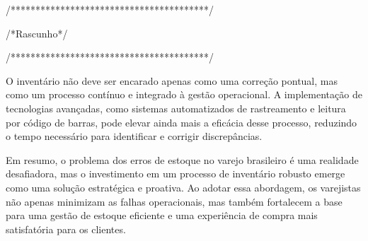 /****************************************/

/*Rascunho*/

/****************************************/

O inventário não deve ser encarado apenas como uma correção pontual, mas como um processo contínuo e integrado à gestão operacional. A implementação de tecnologias avançadas, como sistemas automatizados de rastreamento e leitura por código de barras, pode elevar ainda mais a eficácia desse processo, reduzindo o tempo necessário para identificar e corrigir discrepâncias.

Em resumo, o problema dos erros de estoque no varejo brasileiro é uma realidade desafiadora, mas o investimento em um processo de inventário robusto emerge como uma solução estratégica e proativa. Ao adotar essa abordagem, os varejistas não apenas minimizam as falhas operacionais, mas também fortalecem a base para uma gestão de estoque eficiente e uma experiência de compra mais satisfatória para os clientes.
